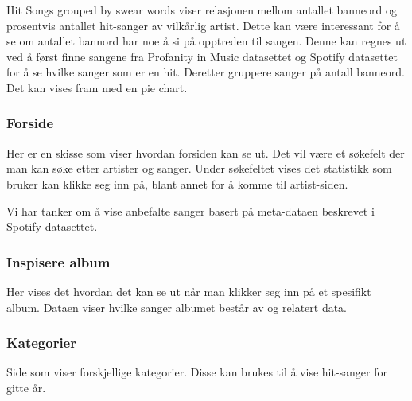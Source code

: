 Hit Songs grouped by swear words viser relasjonen mellom antallet banneord og prosentvis antallet hit-sanger av vilkårlig artist. Dette kan være interessant for å se om antallet bannord har noe å si på opptreden til sangen. Denne kan regnes ut ved å først finne sangene fra Profanity in Music datasettet og Spotify datasettet for å se hvilke sanger som er en hit. Deretter gruppere sanger på antall banneord. Det kan vises fram med en pie chart.

\subsubsection{Forside}
Her er en skisse som viser hvordan forsiden kan se ut. Det vil være et søkefelt der man kan søke etter artister og sanger. Under søkefeltet vises det statistikk som bruker kan klikke seg inn på, blant annet for å komme til artist-siden.

Vi har tanker om å vise anbefalte sanger basert på meta-dataen beskrevet i Spotify datasettet.

\subsubsection{Inspisere album}
Her vises det hvordan det kan se ut når man klikker seg inn på et spesifikt album. Dataen viser hvilke sanger albumet består av og relatert data.

\subsubsection{Kategorier}
Side som viser forskjellige kategorier. Disse kan brukes til å vise hit-sanger for gitte år.